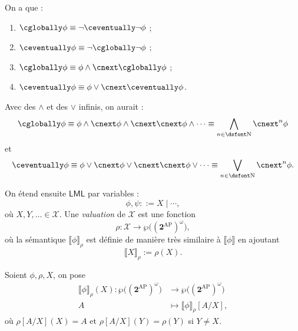 \documentclass[./main]{subfiles}
\begin{document}
  \begin{lem}
    On a que :
    \begin{enumerate}
      \item $\always \phi \equiv \lnot \eventually \lnot \phi$ ;
      \item $\eventually \phi \equiv \lnot \always \lnot \phi$ ;
      \item $\always \phi \equiv \phi \land \nxt \always \phi$ ;
      \item $\eventually \phi \equiv \phi \lor \nxt \eventually \phi$.
    \end{enumerate}
  \end{lem}

  Avec des $\land$ et des $\lor$ infinis, on aurait :
  \[
  \always \phi \equiv \phi \land \nxt \phi \land \nxt\nxt \phi \land \cdots \equiv \bigwedge_{n \in \mathds{N}}\nxt^n \phi
  \] et \[
  \eventually \phi \equiv \phi \lor \nxt \phi \lor \nxt\nxt \phi \lor \cdots \equiv \bigvee_{n \in \mathds{N}}\nxt^n \phi
  .\]

  \begin{defn}
    On étend ensuite $\mathsf{LML}$ par variables :
    \[
    \phi, \psi ::= X  \mid \cdots
    ,\] 
    où $X, Y, \ldots \in \mathcal{X}$.
    Une \textit{valuation} de $\mathcal{X}$ est une fonction \[
    \rho : \mathcal{X} \to \wp\big((\mathbf{2}^\mathrm{AP})^\omega\big)
    ,\]
    où la sémantique $\llbracket \phi\rrbracket_\rho$ est définie de manière très similaire à $\llbracket \phi\rrbracket  $ en ajoutant 
    \[
    \llbracket X\rrbracket_\rho := \rho(X) 
    .\]
  \end{defn}

  \begin{nota}
    Soient $\phi, \rho, X$, on pose 
    \begin{align*}
      \llbracket \phi\rrbracket_\rho(X) : \wp\big((\mathbf{2}^\mathrm{AP})^\omega\big) &\longrightarrow \wp\big((\mathbf{2}^\mathrm{AP})^\omega\big) \\
      A &\longmapsto \llbracket \phi\rrbracket_\rho[A / X]
    ,\end{align*}
    où $\rho[A / X](X) = A$ et  $\rho[A / X](Y) = \rho(Y)$ si  $Y \neq X$.
  \end{nota}
\end{document}
